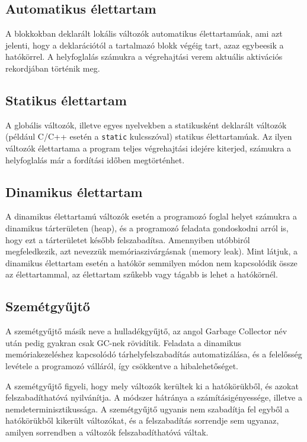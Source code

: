 \documentclass[margin=0px]{article}
\begin{document}
\subsection{Automatikus élettartam}

A blokkokban deklarált lokális változók automatikus élettartamúak, ami azt jelenti, hogy a deklarációtól a tartalmazó blokk végéig tart, azaz egybeesik a hatókörrel. A helyfoglalás számukra a végrehajtási verem aktuális aktivációs rekordjában történik meg.

\subsection{Statikus élettartam}

A globális változók, illetve egyes nyelvekben a statikusként deklarált változók (például C/C++ esetén a \texttt{static} kulcsszóval) statikus élettartamúak. Az ilyen változók élettartama a program teljes végrehajtási idejére kiterjed, számukra a helyfoglalás már a fordítási időben megtörténhet.

\subsection{Dinamikus élettartam}

A dinamikus élettartamú változók esetén a programozó foglal helyet számukra a dinamikus tárterületen (heap), és a programozó feladata gondoskodni arról is, hogy ezt a tárterületet később felszabadítsa. Amennyiben utóbbiról megfeledkezik, azt nevezzük memóriaszivárgásnak (memory leak).
Mint látjuk, a dinamikus élettartam esetén a hatókör semmilyen módon nem kapcsolódik össze az élettartammal, az élettartam szűkebb vagy tágabb is lehet a hatókörnél.

\subsection{Szemétgyűjtő}

A szemétgyűjtő másik neve a hulladékgyűjtő, az angol Garbage Collector név után pedig gyakran csak GC-nek rövidítik. Feladata a dinamikus memóriakezeléshez kapcsolódó tárhelyfelszabadítás automatizálása, és a felelősség levétele a programozó válláról, így csökkentve a hibalehetőséget.

A szemétgyűjtő figyeli, hogy mely változók kerültek ki a hatókörükből, és azokat felszabadíthatóvá nyilvánítja. A módszer hátránya a számításigényessége, illetve a nemdeterminisztikussága. A szemétgyűjtő ugyanis nem szabadítja fel egyből a hatókörükből kikerült változókat, és a felszabadítás sorrendje sem ugyanaz, amilyen sorrendben a változók felszabadíthatóvá váltak.
\end{document}
